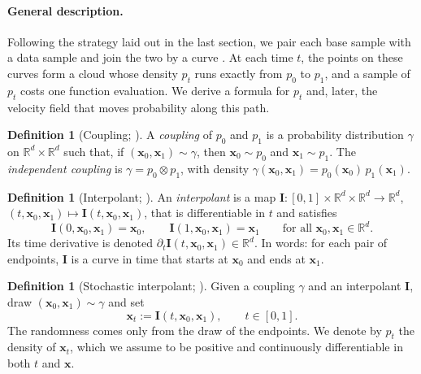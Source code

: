 \documentclass[11pt,a4paper]{article}
\numberwithin{equation}{section}     %
\theoremstyle{plain}        %
\theoremstyle{definition}   %
\newtheorem{definition}[theorem]{Definition}
\theoremstyle{remark}       %
\begin{document}
\paragraph{General description.} Following the strategy laid out in the last section, we pair each base sample with a data sample and join the two by a curve \citep{albergo2023building,albergo2023stochastic}. At each time $t$, the points on these curves form a cloud whose density $p_t$ runs exactly from $p_0$ to $p_1$, and a sample of $p_t$ costs one function evaluation. We derive a formula for $p_t$ and, later, the velocity field that moves probability along this path.

\begin{definition}[Coupling; \citealp{villani2009}]\label{def:coupling}
A \emph{coupling} of $p_0$ and $p_1$ is a probability distribution $\gamma$ on $\mathbb{R}^d\times\mathbb{R}^d$ such that, if $(\mathbf{x}_0,\mathbf{x}_1)\sim\gamma$, then $\mathbf{x}_0\sim p_0$ and $\mathbf{x}_1\sim p_1$. The \emph{independent coupling} is $\gamma=p_0\otimes p_1$, with density $\gamma(\mathbf{x}_0,\mathbf{x}_1)=p_0(\mathbf{x}_0)\,p_1(\mathbf{x}_1)$.
\end{definition}

\begin{definition}[Interpolant; \citealp{albergo2023building}]\label{def:interpolant}
An \emph{interpolant} is a map $\mathbf{I}:[0,1]\times\mathbb{R}^d\times\mathbb{R}^d\to\mathbb{R}^d$, $(t,\mathbf{x}_0,\mathbf{x}_1)\mapsto\mathbf{I}(t,\mathbf{x}_0,\mathbf{x}_1)$, that is differentiable in $t$ and satisfies
\[
\mathbf{I}(0,\mathbf{x}_0,\mathbf{x}_1)=\mathbf{x}_0,\qquad\mathbf{I}(1,\mathbf{x}_0,\mathbf{x}_1)=\mathbf{x}_1\qquad\text{for all }\mathbf{x}_0,\mathbf{x}_1\in\mathbb{R}^d .
\]
Its time derivative is denoted $\partial_t\mathbf{I}(t,\mathbf{x}_0,\mathbf{x}_1)\in\mathbb{R}^d$. In words: for each pair of endpoints, $\mathbf{I}$ is a curve in time that starts at $\mathbf{x}_0$ and ends at $\mathbf{x}_1$.
\end{definition}

\begin{definition}[Stochastic interpolant; \citealp{albergo2023stochastic}]\label{def:si}
Given a coupling $\gamma$ and an interpolant $\mathbf{I}$, draw $(\mathbf{x}_0,\mathbf{x}_1)\sim\gamma$ and set
\[
\mathbf{x}_t:=\mathbf{I}(t,\mathbf{x}_0,\mathbf{x}_1),\qquad t\in[0,1].
\]
The randomness comes only from the draw of the endpoints. We denote by $p_t$ the density of $\mathbf{x}_t$, which we assume to be positive and continuously differentiable in both $t$ and $\mathbf{x}$.
\end{definition}
\end{document}
